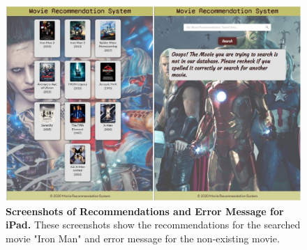 \begin{figure}[ht]
	\centering
  	\includegraphics[width=1.0\textwidth]{images/iPad_2.JPG}
	\caption{\textbf{Screenshots of Recommendations and Error Message for iPad.} These screenshots show the recommendations for the searched movie "Iron Man" and error message for the non-existing movie.}
  	\label{fig:ipad-2}
\end{figure}
